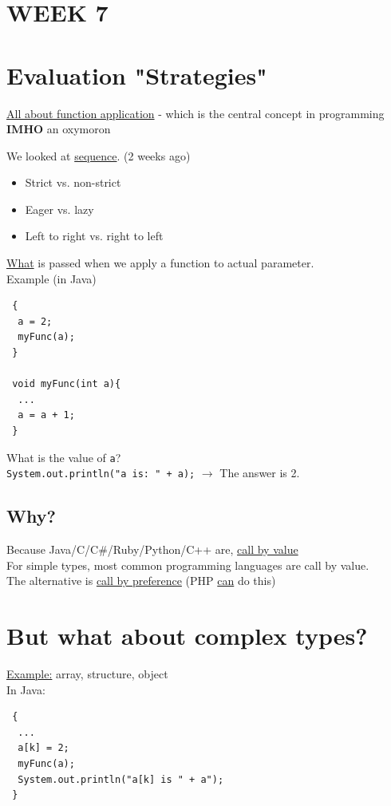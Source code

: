 \documentclass{article}
\begin{document}
\begin{flushleft}
\bigskip
\section*{WEEK 7}
\section*{Evaluation "Strategies"}
\underline{All about function application} - which is the central concept in programming \textbf{IMHO} an oxymoron
\begin{flushleft}
 We looked at \underline{sequence}. (2 weeks ago)
 \begin{itemize}
  \item Strict vs. non-strict
  \item Eager vs. lazy
  \item Left to right vs. right to left
 \end{itemize}
\underline{What} is passed when we apply a function to actual parameter.\\
Example (in Java)\\
\begin{verbatim}
 {
  a = 2;
  myFunc(a);
 }
 
 void myFunc(int a){
  ...
  a = a + 1;
 }
\end{verbatim}
What is the value of \verb|a|?\\
\verb|System.out.println("a is: " + a);| $\rightarrow$ The answer is 2.
\end{flushleft}
\subsection*{Why?}
\begin{flushleft}
 Because Java/C/C\#/Ruby/Python/C++ are, \underline{call by value}\\
 For simple types, most common programming languages are call by value.\\
 The alternative is \underline{call by preference} (PHP \underline{can} do this)
\end{flushleft}
\section*{But what about complex types?}
\underline{Example:} array, structure, object\\
In Java:
\begin{verbatim}
 {
  ...
  a[k] = 2;
  myFunc(a);
  System.out.println("a[k] is " + a");
 }
 

\end{verbatim}
\end{flushleft}
\end{document}
